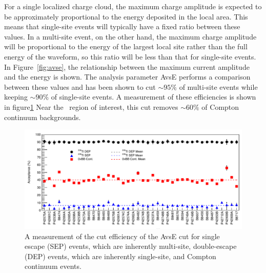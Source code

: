 \documentclass[/main.tex]{subfiles}
\begin{document}
For a single localized charge cloud, the maximum charge amplitude is expected to be approximately proportional to the energy deposited in the local area.
This means that single-site events will typically have a fixed ratio between these values.
In a multi-site event, on the other hand, the maximum charge amplitude will be proportional to the energy of the largest local site rather than the full energy of the waveform, so this ratio will be less than that for single-site events.
In Figure~\ref{fig:avse}, the relationship between the maximum current amplitude and the energy is shown.
The analysis parameter AvsE performs a comparison between these values and has been shown to cut ${\sim}95\%$ of multi-site events while keeping ${\sim}90\%$ of single-site events.
A measurement of these efficiencies is shown in figure\ref{fig:avseeff}
Near the \znbb\ region of interest, this cut removes ${\sim}60\%$ of Compton continuum backgrounds.
\begin{figure}
  \centering
  \includegraphics[width=\textwidth]{avseefficiency}
  \caption[Multi-site waveform cut efficiency]{\label{fig:avseeff}
    A measurement of the cut efficiency of the AvsE cut for single escape (SEP) events, which are inherently multi-site, double-escape (DEP) events, which are inherently single-site, and Compton continuum events.
  }
\end{figure}
\end{document}
